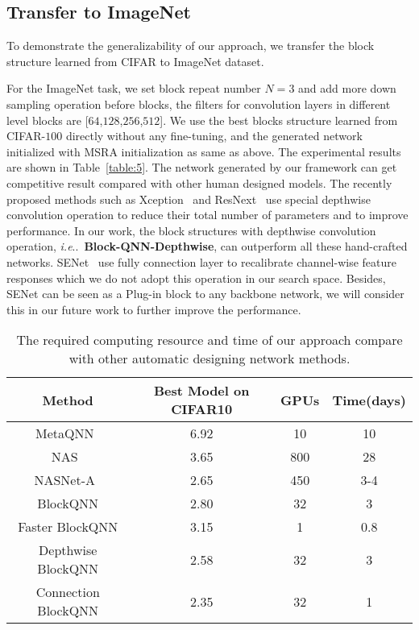 \documentclass[10pt,journal,compsoc]{IEEEtran}
\makeatletter
\DeclareRobustCommand\onedot{\futurelet\@let@token\@onedot}
\def\@onedot{\ifx\@let@token.\else.\null\fi\xspace}
\def\ie{\emph{i.e}\onedot} \def\Ie{\emph{I.e}\onedot}
\makeatother
\begin{document}
\subsection{Transfer to ImageNet}
To demonstrate the generalizability of our approach, we transfer the block structure learned from CIFAR to ImageNet dataset. 

For the ImageNet task, we set block repeat number $N=3$ and add more down sampling operation before blocks, the filters for convolution layers in different level blocks are [$64$,$128$,$256$,$512$]. We use the best blocks structure learned from CIFAR-$100$ directly without any fine-tuning, and the generated network initialized with MSRA initialization as same as above. The experimental results are shown in Table~\ref{table:5}. The network generated by our framework can get competitive result compared with other human designed models. The recently proposed methods such as Xception~\cite{chollet2016xception} and ResNext~\cite{xie2016aggregated} use special depthwise convolution operation to reduce their total number of parameters and to improve performance. In our work, the block structures with depthwise convolution operation, \ie~\textbf{Block-QNN-Depthwise}, can outperform all these hand-crafted networks. 
SENet~\cite{hu2018senet} use fully connection layer to recalibrate channel-wise feature responses which we do not adopt this operation in our search space. Besides, SENet can be seen as a Plug-in block to any  backbone network, we will consider this in our future work to further improve the performance.


\begin{table}[t!]
	\renewcommand{\arraystretch}{1.3}
	\footnotesize
	\begin{center}
		\caption{The required computing resource and time of our approach compare with other automatic designing network methods.}\label{table:4}
		\begin{tabular}{c|c|c|c}
			\hline
			Method  & Best Model on CIFAR10  &GPUs & Time(days)\\
			\hline
			
			\hline
			MetaQNN~\cite{baker2016designing} & 6.92 & 10 & 10 \\
			\hline
			NAS~\cite{zoph2016neural} & 3.65 & 800 & 28  \\
			\hline
			NASNet-A~\cite{zoph2018learning} & 2.65 & 450 & 3-4  \\
			\hline
			
			\hline
			BlockQNN & 2.80 & 32 & 3  \\
			Faster BlockQNN & 3.15 & 1 & 0.8  \\
		    Depthwise BlockQNN & 2.58 & 32 & 3  \\
		    Connection BlockQNN & 2.35 & 32 & 1  \\
			\hline
		\end{tabular}
	\end{center}

\end{table}
\end{document}
